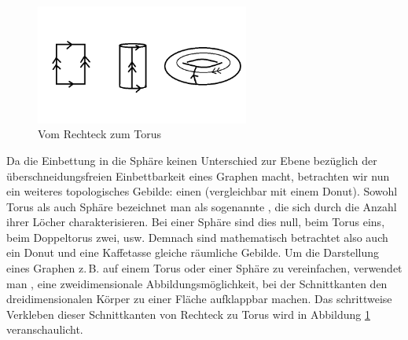 




\begin{figure}
	\centering
		\includegraphics[width=7cm]{img/2to3D.png}
\caption{Vom Rechteck zum Torus}
\label{Q2T}
\end{figure}

Da die Einbettung in die Sphäre keinen Unterschied zur Ebene bezüglich der überschneidungsfreien Einbettbarkeit eines Graphen macht, betrachten wir nun ein weiteres topologisches Gebilde: einen  (vergleichbar mit einem Donut). Sowohl Torus als auch Sphäre bezeichnet man als sogenannte , die sich durch die Anzahl ihrer Löcher charakterisieren. Bei einer Sphäre sind dies null, beim Torus eins, beim Doppeltorus zwei, usw. Demnach sind mathematisch betrachtet also auch ein Donut und eine Kaffetasse gleiche räumliche Gebilde.
Um die Darstellung eines Graphen z.\,B. auf einem Torus oder einer Sphäre zu vereinfachen, verwendet man , eine zweidimensionale Abbildungsmöglichkeit, bei der Schnittkanten den dreidimensionalen Körper zu einer Fläche aufklappbar machen. Das schrittweise Verkleben dieser Schnittkanten von Rechteck zu Torus wird in Abbildung \ref{Q2T} veranschaulicht.

